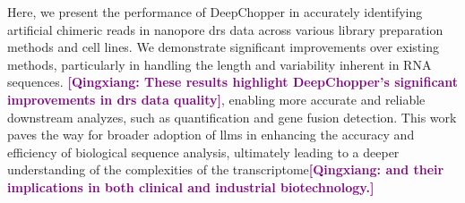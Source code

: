 \documentclass[pdflatex, sn-mathphys-num, lineno]{sn-jnl}%
\newcommand{\qx}[1]{\textcolor{purple}{\textbf{[Qingxiang: #1]}}}
\theoremstyle{thmstyleone}%
\theoremstyle{thmstyletwo}%
\theoremstyle{thmstylethree}%
\begin{document}
Here, we present the performance of DeepChopper in accurately identifying artificial chimeric reads in nanopore \gls{drs} data across various library preparation methods and cell lines.
We demonstrate significant improvements over existing methods, particularly in handling the length and variability inherent in RNA sequences.
\qx{These results highlight DeepChopper's significant improvements in \gls{drs} data quality}, enabling more accurate and reliable downstream analyzes, such as quantification and gene fusion detection.
This work paves the way for broader adoption of \glspl{llm} in enhancing the accuracy and efficiency of biological sequence analysis, ultimately leading to a deeper understanding of the complexities of the transcriptome\qx{and their implications in both clinical and industrial biotechnology.}
\end{document}
